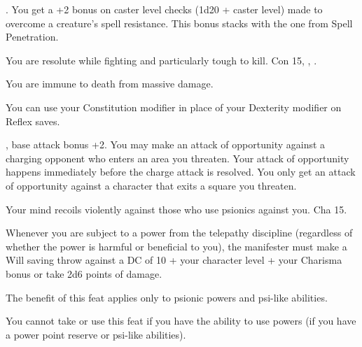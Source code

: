 {.}
{You get a +2 bonus on caster level checks (1d20 + caster level) made to overcome a creature's spell resistance. This bonus stacks with the one from Spell Penetration.}


{You are resolute while fighting and particularly tough to kill.}
{Con 15, , .}
{You are immune to death from massive damage.

You can use your Constitution modifier in place of your Dexterity modifier on Reflex saves.}
{}{}

{}
{, base attack bonus +2.}
{You may make an attack of opportunity against a charging opponent who enters an area you threaten. Your attack of opportunity happens immediately before the charge attack is resolved.}
{You only get an attack of opportunity against a character that exits a square you threaten.}
{}

{Your mind recoils violently against those who use psionics against you.}
{Cha 15.}
{Whenever you are subject to a power from the telepathy discipline (regardless of whether the power is harmful or beneficial to you), the manifester must make a Will saving throw against a DC of 10 + \onehalf your character level + your Charisma bonus or take 2d6 points of damage.

The benefit of this feat applies only to psionic powers and psi-like abilities. %
}{}
{You cannot take or use this feat if you have the ability to use powers (if you have a power point reserve or psi-like abilities).}

